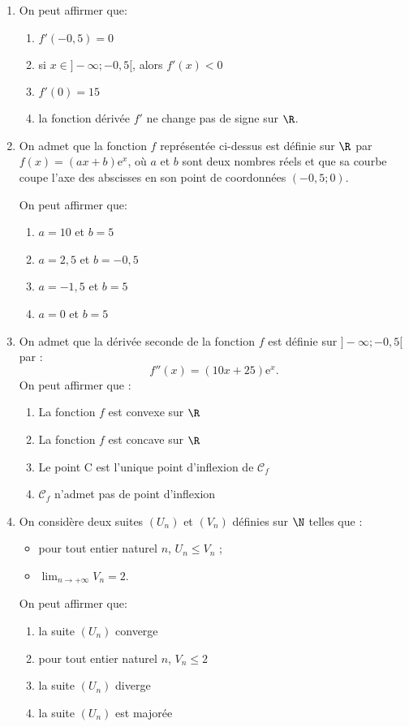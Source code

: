 \begin{enumerate}
	\item On peut affirmer que:
	\begin{enumerate}
		\item $f'(-0,5) = 0$
		\item si $x \in ]- \infty;-0,5[$, alors $f'(x) < 0$
		\item $f'(0) = 15$
		\item la fonction dérivée $f'$ ne change pas de
		signe sur $\R$.
	\end{enumerate}
	\item On admet que la fonction $f$ représentée ci-dessus est définie sur $\R$ par $f(x) = (ax + b)\text{e}^x$, où $a$ et $b$ sont deux nombres réels et que sa courbe coupe l'axe des abscisses en son point de coordonnées $(-0,5; 0)$.
	
	On peut affirmer que:
	\begin{enumerate}
		\item $a = 10$ et $b = 5$ 
		\item $a = 2,5$ et $b = -0,5$ 
		\item $a = -1,5$ et $b = 5$ 
		\item $a = 0$ et $b = 5$
	\end{enumerate}
	\item On admet que la dérivée seconde de la fonction $f$ est définie sur $]- \infty;-0,5[$ par : \[f''(x) = (10x + 25)\text{e}^x.\]
	On peut affirmer que :
	\begin{enumerate}
		\item La fonction $f$ est convexe sur $\R$
		\item La fonction $f$ est concave sur $\R$
		\item Le point C est l'unique point d'inflexion de $\mathcal{C}_f$
		\item $\mathcal{C}_f$ n'admet pas de point d'inflexion
	\end{enumerate}
	\item On considère deux suites $\left(U_n\right)$ et  $\left(V_n\right)$ définies sur $\N$ telles que : 
	\begin{itemize}
		\item pour tout entier naturel $n$, $U_n \leqslant V_n$ ;
		\item $\displaystyle\lim_{n \to+ \infty}  V_n= 2$.
	\end{itemize}
	On peut affirmer que:
	
	\begin{enumerate}
		\item la suite $\left(U_n\right)$ converge 
		\item pour tout entier naturel $n$, $V_n \leqslant 2$
		\item la suite $\left(U_n\right)$ diverge
		\item la suite $\left(U_n\right)$ est majorée
	\end{enumerate} 
\end{enumerate}

